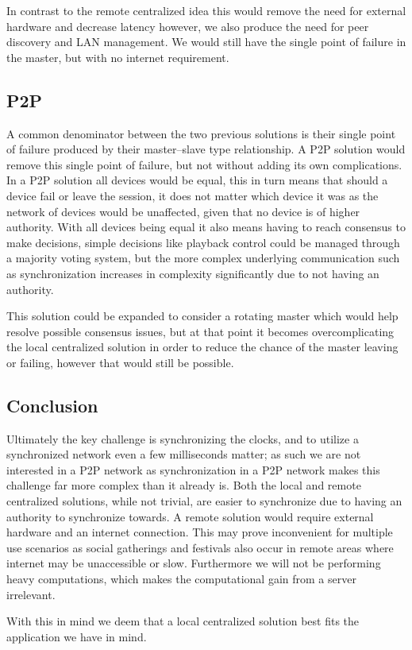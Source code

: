 In contrast to the remote centralized idea this would remove the need for external hardware and decrease latency however, we also produce the need for peer discovery and LAN management.
We would still have the single point of failure in the master, but with no internet requirement.

\subsection{\acl{P2P}}
A common denominator between the two previous solutions is their single point of failure produced by their master--slave type relationship.
A \ac{P2P} solution would remove this single point of failure, but not without adding its own complications.
In a \ac{P2P} solution all devices would be equal, this in turn means that should a device fail or leave the session, it does not matter which device it was as the network of devices would be unaffected, given that no device is of higher authority.
With all devices being equal it also means having to reach consensus to make decisions, simple decisions like playback control could be managed through a majority voting system, but the more complex underlying communication such as synchronization increases in complexity significantly due to not having an authority.

This solution could be expanded to consider a rotating master which would help resolve possible consensus issues, but at that point it becomes overcomplicating the local centralized solution in order to reduce the chance of the master leaving or failing, however that would still be possible.

\subsection{Conclusion}
Ultimately the key challenge is synchronizing the clocks, and to utilize a synchronized network even a few milliseconds matter; as such we are not interested in a \ac{P2P} network as synchronization in a \ac{P2P} network makes this challenge far more complex than it already is.
Both the local and remote centralized solutions, while not trivial, are easier to synchronize due to having an authority to synchronize towards.
A remote solution would require external hardware and an internet connection.
This may prove inconvenient for multiple use scenarios as social gatherings and festivals also occur in remote areas where internet may be unaccessible or slow. 
Furthermore we will not be performing heavy computations, which makes the computational gain from a server irrelevant.

With this in mind we deem that a local centralized solution best fits the application we have in mind. 
